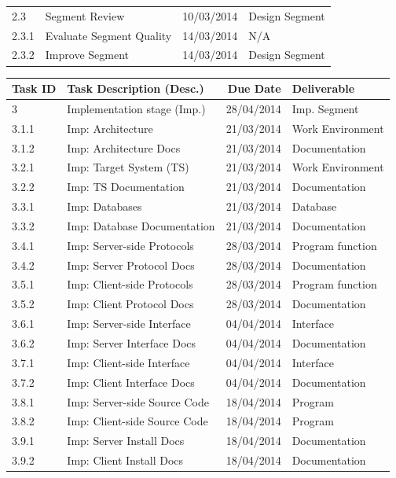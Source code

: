 \begin{tabular}{llrl}
    2.3      & Segment Review               & 10/03/2014  & Design Segment    \\
    2.3.1    & Evaluate Segment Quality     & 14/03/2014  & N/A               \\
    2.3.2    & Improve Segment              & 14/03/2014  & Design Segment    \\
    
    \bottomrule
\end{tabular}

\pagebreak

\begin{tabular}{llrl}
    
    \toprule
    
    Task ID  & Task Description (Desc.)     & Due Date    & Deliverable       \\
    
    \midrule
    
    3        & Implementation stage (Imp.)  & 28/04/2014  & Imp. Segment      \\
    3.1.1    & Imp: Architecture            & 21/03/2014  & Work Environment  \\
    3.1.2    & Imp: Architecture Docs       & 21/03/2014  & Documentation     \\
    3.2.1    & Imp: Target System  (TS)     & 21/03/2014  & Work Environment  \\
    3.2.2    & Imp: TS Documentation        & 21/03/2014  & Documentation     \\
    3.3.1    & Imp: Databases               & 21/03/2014  & Database          \\
    3.3.2    & Imp: Database Documentation  & 21/03/2014  & Documentation     \\
    3.4.1    & Imp: Server-side Protocols   & 28/03/2014  & Program function  \\
    3.4.2    & Imp: Server Protocol Docs    & 28/03/2014  & Documentation     \\
    3.5.1    & Imp: Client-side Protocols   & 28/03/2014  & Program function  \\
    3.5.2    & Imp: Client Protocol Docs    & 28/03/2014  & Documentation     \\
    3.6.1    & Imp: Server-side Interface   & 04/04/2014  & Interface         \\
    3.6.2    & Imp: Server Interface Docs   & 04/04/2014  & Documentation     \\
    3.7.1    & Imp: Client-side Interface   & 04/04/2014  & Interface         \\
    3.7.2    & Imp: Client Interface Docs   & 04/04/2014  & Documentation     \\
    3.8.1    & Imp: Server-side Source Code & 18/04/2014  & Program           \\
    3.8.2    & Imp: Client-side Source Code & 18/04/2014  & Program           \\
    3.9.1    & Imp: Server Install Docs     & 18/04/2014  & Documentation     \\
    3.9.2    & Imp: Client Install Docs     & 18/04/2014  & Documentation     \\
    \cmidrule(r){2-3}
    

\end{tabular}
